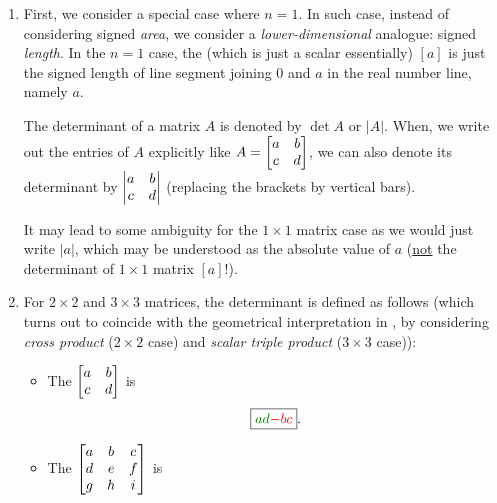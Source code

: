 \begin{enumerate}
\begin{center}
\begin{tikzpicture}
\end{tikzpicture}
\end{center}
\item First, we consider a special case where \(n=1\). In such case, instead of
considering signed \emph{area}, we consider a \emph{lower-dimensional}
analogue: signed \emph{length}. In the \(n=1\) case, the  (which is just a scalar essentially) \([a]\) is just
the signed length of line segment joining \(0\) and \(a\) in the real number
line, namely \(\boxed{a}\).
\begin{center}
\end{center}
\begin{note}
The determinant of a matrix \(A\) is denoted by \(\det A\) or \(|A|\).
When, we
write out the entries of \(A\) explicitly like \(A=\mqty[a&b\\ c&d]\), we can
also denote its determinant by \(\mqty|a&b\\ c&d|\) (replacing the brackets by
vertical bars).
\begin{warning}
It may lead to some ambiguity for the \(1\times 1\) matrix case as we would
just write \(|a|\), which may be understood as the absolute value of \(a\)
(\underline{not} the determinant of \(1\times 1\) matrix \([a]\)!).
\end{warning}
\end{note}
\item For \(2\times 2\) and \(3\times 3\) matrices, the determinant is defined
as follows (which turns out to coincide with the geometrical interpretation in
, by considering \emph{cross product} (\(2\times 2\)
case) and \emph{scalar triple product} (\(3\times 3\) case)):
\begin{itemize}
\item The  \(\mqty[a&b\\ c&d]\) is
\[
\boxed{\gc{ad}\rc{-bc}}.
\]
\item The  \(\mqty[a&b&c\\ d&e&f\\ g&h&i]\) is

\end{itemize}
\end{enumerate}
